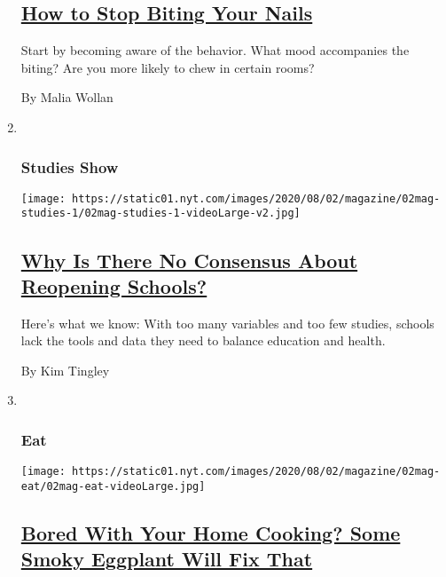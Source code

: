 \begin{enumerate}
  \hypertarget{how-to-stop-biting-your-nails}{%
  \subsection{\texorpdfstring{\href{/2020/07/28/magazine/how-to-stop-biting-your-nails.html}{How
  to Stop Biting Your
  Nails}}{How to Stop Biting Your Nails}}\label{how-to-stop-biting-your-nails}}

  Start by becoming aware of the behavior. What mood accompanies the
  biting? Are you more likely to chew in certain rooms?

  By Malia Wollan
\item ~
  \hypertarget{studies-show}{%
  \subsubsection{Studies Show}\label{studies-show}}

  \texttt{[image: https://static01.nyt.com/images/2020/08/02/magazine/02mag-studies-1/02mag-studies-1-videoLarge-v2.jpg]}

  \hypertarget{why-is-there-no-consensus-about-reopening-schools}{%
  \subsection{\texorpdfstring{\href{/2020/07/29/magazine/schools-reopening-covid.html}{Why
  Is There No Consensus About Reopening
  Schools?}}{Why Is There No Consensus About Reopening Schools?}}\label{why-is-there-no-consensus-about-reopening-schools}}

  Here's what we know: With too many variables and too few studies,
  schools lack the tools and data they need to balance education and
  health.

  By Kim Tingley
\item ~
  \hypertarget{eat}{%
  \subsubsection{Eat}\label{eat}}

  \texttt{[image: https://static01.nyt.com/images/2020/08/02/magazine/02mag-eat/02mag-eat-videoLarge.jpg]}

  \hypertarget{bored-with-your-home-cooking-some-smoky-eggplant-will-fix-that}{%
  \subsection{\texorpdfstring{\href{/2020/07/29/magazine/bored-with-your-home-cooking-some-smoky-eggplant-will-fix-that.html}{Bored
  With Your Home Cooking? Some Smoky Eggplant Will Fix
  That}}{Bored With Your Home Cooking? Some Smoky Eggplant Will Fix That}}\label{bored-with-your-home-cooking-some-smoky-eggplant-will-fix-that}}


\end{enumerate}
